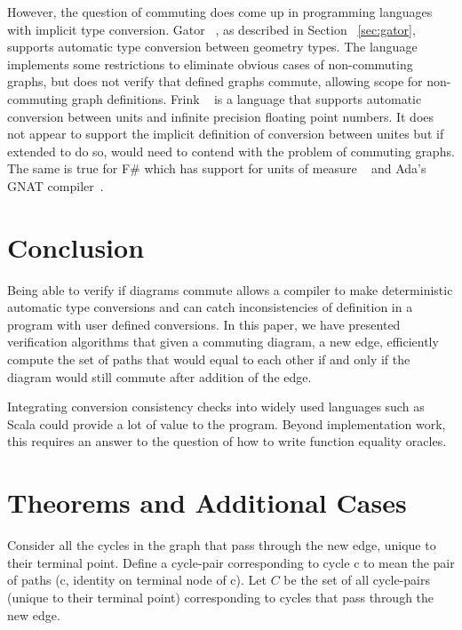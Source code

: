 \documentclass[sigplan,review,anonymous]{acmart}
\begin{document}
{However, the question of commuting does come up in programming languages with implicit type conversion.
Gator ~\cite{gator}, as described in Section ~\ref{sec:gator}, supports automatic type conversion between geometry types.
The language implements some restrictions to eliminate obvious cases of non-commuting graphs, but does not verify that defined graphs commute, allowing scope for non-commuting graph definitions.
Frink ~\cite{frink} is a language that supports automatic conversion between units and infinite precision floating point numbers.
It does not appear to support the implicit definition of conversion between unites  but if extended to do so, would need to contend with the problem of commuting graphs.
The same is true for F\# which has support for units of measure ~\cite{unitsOfMeasure} and Ada's GNAT compiler~\cite{gnat}.

\section{Conclusion}

Being able to verify if diagrams commute allows a compiler to make
deterministic automatic type conversions and can catch inconsistencies of definition in a program with user defined conversions.  In this paper, we have presented verification algorithms that given a commuting diagram, a new edge, efficiently compute the set of paths that would equal to each other if and only if the diagram would still commute after addition of the edge.

Integrating conversion consistency checks into widely used languages such as Scala could provide a lot of value to the program.
Beyond implementation work, this requires an answer to the question of how to write function equality oracles.




\appendix

\section{Theorems and Additional Cases}

Consider all the cycles in the graph that pass through the new edge, unique to their terminal point.
Define a cycle-pair corresponding to cycle c to mean the pair of paths (c, identity on terminal node of c).
Let $C$ be the set of all cycle-pairs (unique to their terminal point) corresponding to cycles that pass through the new edge.

}
\end{document}
